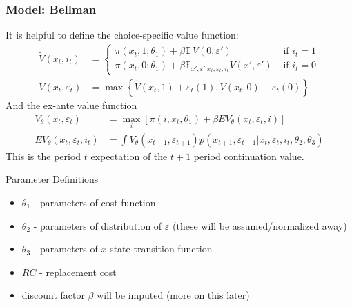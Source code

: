 \documentclass[aspectratio=169,11pt]{beamer}
\begin{document}


\begin{frame}
\frametitle{Model: Bellman}
It is helpful to define the \alert{choice-specific value function}:
\begin{align*}
\tilde V (x_t, i_t) &= \left \{ 
\begin{array}{lr}
 \pi(x_t, 1;\theta_1) + \beta \mathbb{E}\, V(0, \varepsilon ')  & \text{ if } i_t = 1 \\
 \pi(x_t , 0; \theta_1) + \beta \mathbb{E}_{x', \varepsilon ' | x_t, \varepsilon_t, i_t} V(x', \varepsilon ')   & \text{ if } i_t = 0
\end{array}
\right .\\
V(x_t,\varepsilon_t) &= \max \left\{ 
\tilde V (x_t, 1) + \varepsilon_{t}(1),
\tilde V(x_t, 0) + \varepsilon_{t}(0) 
\right\}
\end{align*}
And the \alert{ex-ante value function}
 \begin{align*}
		V_{\theta}\left(x_{t},\varepsilon_{t}\right) &= \max_{i} \left[ \pi \left(i,x_{t},\theta_1 \right) +
		\beta EV_{\theta}\left(x_{t},\varepsilon_{t},i \right) \right]\\
	 EV_{\theta}\left(x_{t},\varepsilon_{t},i_{t}\right) &=\int V_{\theta}\left(x_{t+1},\varepsilon_{t+1}\right) p\left(x_{t+1}, \varepsilon_{t+1} |x_{t},\varepsilon_{t},i_{t},\theta_{2},\theta_{3}\right)
\end{align*}
This is the period $t$ expectation of the $t+1$ period continuation value.

\end{frame}



\begin{frame}{Parameter Definitions}
\begin{itemize}
	\item $\theta_{1}$ - parameters of cost function
	\item $\theta_{2}$ - parameters of distribution of $\varepsilon$ (these will be assumed/normalized away)
	\item $\theta_{3}$ - parameters of $x$-state transition function
	\item $RC$ - replacement cost
	\item discount factor $\beta$ will be imputed (more on this later)
\end{itemize}

\end{frame}
\end{document}

